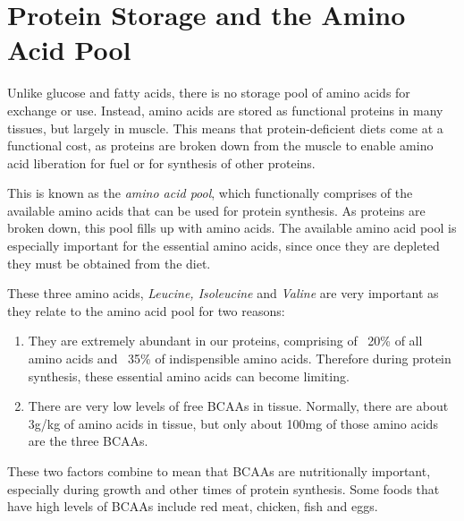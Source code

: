 \documentclass{tufte-handout}
\begin{document}
\section{Protein Storage and the Amino Acid Pool}

Unlike glucose and fatty acids, there is no storage pool of amino acids for exchange or use.  Instead, amino acids are stored as functional proteins in many tissues, but largely in muscle.  This means that protein-deficient diets come at a functional cost, as proteins are broken down from the muscle to enable amino acid liberation for fuel or for synthesis of other proteins.

  This is known as the \emph{amino acid pool}, which functionally comprises of the available amino acids that can be used for protein synthesis.  As proteins are broken down, this pool fills up with amino acids.  The available amino acid pool is especially important for the essential amino acids, since once they are depleted they must be obtained from the diet.

  These three amino acids, \emph{Leucine, Isoleucine} and \emph{Valine} are very important as they relate to the amino acid pool for two reasons:
\begin{enumerate}
\item They are extremely abundant in our proteins, comprising of ~20\% of all amino acids and ~35\% of indispensible amino acids.  Therefore during protein synthesis, these essential amino acids can become limiting.
\item There are very low levels of free BCAAs in tissue.  Normally, there are about 3g/kg of amino acids in tissue, but only about 100mg of those amino acids are the three BCAAs.
\end{enumerate}

These two factors combine to mean that BCAAs are nutritionally important, especially during growth and other times of protein synthesis.  Some foods that have  high levels of BCAAs include red meat, chicken, fish and eggs.
\end{document}
